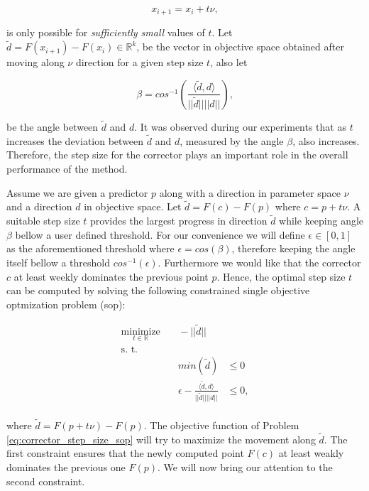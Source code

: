 \begin{equation}
	x_{i+1} = x_i + t \nu,
	\label{eq:movement_along_nu}
\end{equation}

is only possible for \emph{sufficiently small} values of $t$. Let $\tilde{d} = F(x_{i+1}) - F(x_i) \in \mathbb{R}^k$, be the vector in objective space obtained after moving along $\nu$ direction for a given step size $t$, also let 

\begin{equation}
\beta = cos^{-1}(\frac{\langle \tilde{d}, d \rangle}{|| \tilde{d} ||  || d || }),
\label{eq:dot_product_cosine2}
\end{equation}

be the angle between $\tilde{d}$ and $d$. It was observed during our experiments that as $t$ increases the deviation between $\tilde{d}$ and $d$, measured by the angle $\beta$, also increases. Therefore, the step size for the corrector plays an important role in the overall performance of the method.

Assume we are given a predictor $p$ along with a direction in parameter space $\nu$ and a direction $d$ in objective space. Let $\tilde{d} = F(c) - F(p)$ where $c = p + t \nu$. A suitable step size $t$ provides the largest progress in direction $\tilde{d}$ while keeping angle $\beta$ bellow a user defined threshold. For our convenience we will define $\epsilon \in [0,1]$ as the aforementioned threshold where $\epsilon = cos(\beta)$, therefore keeping the angle itself bellow a threshold $cos^{-1}(\epsilon)$. Furthermore we would like that the corrector $c$ at least weekly dominates the previous point $p$. Hence, the optimal step size $t$ can be computed by solving the following constrained single objective optmization problem (\gls{sop}):

\begin{equation}
	\begin{aligned}
	\underset{t \in \mathbb{R}}{\text{minimize}}
	& \quad -|| \tilde{d} ||\\
	\text{s. t.}\\
	& \quad min(\tilde{d}) & \leq 0\\
	& \quad \epsilon - \frac{\langle \tilde{d}, d \rangle}{|| \tilde{d} || || d ||} & \leq 0,\\
	\end{aligned}
	\label{eq:corrector_step_size_sop}
\end{equation}

where $\tilde{d} = F(p + t \nu) - F(p)$. The objective function of Problem \eqref{eq:corrector_step_size_sop} will try to maximize the movement along $\tilde{d}$. The first constraint ensures that the newly computed point $F(c)$ at least weakly dominates the previous one $F(p)$. We will now bring our attention to the second constraint.

